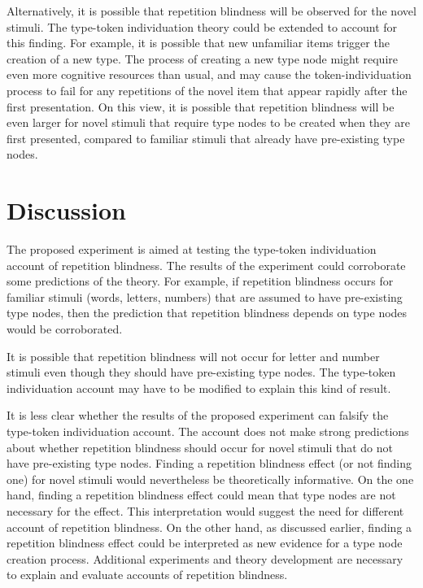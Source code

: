\documentclass[
  man,floatsintext]{apa6}
\begin{document}
Alternatively, it is possible that repetition blindness will be observed for the novel stimuli. The type-token individuation theory could be extended to account for this finding. For example, it is possible that new unfamiliar items trigger the creation of a new type. The process of creating a new type node might require even more cognitive resources than usual, and may cause the token-individuation process to fail for any repetitions of the novel item that appear rapidly after the first presentation. On this view, it is possible that repetition blindness will be even larger for novel stimuli that require type nodes to be created when they are first presented, compared to familiar stimuli that already have pre-existing type nodes.

\hypertarget{discussion}{%
\section{Discussion}\label{discussion}}

The proposed experiment is aimed at testing the type-token individuation account of repetition blindness. The results of the experiment could corroborate some predictions of the theory. For example, if repetition blindness occurs for familiar stimuli (words, letters, numbers) that are assumed to have pre-existing type nodes, then the prediction that repetition blindness depends on type nodes would be corroborated.

It is possible that repetition blindness will not occur for letter and number stimuli even though they should have pre-existing type nodes. The type-token individuation account may have to be modified to explain this kind of result.

It is less clear whether the results of the proposed experiment can falsify the type-token individuation account. The account does not make strong predictions about whether repetition blindness should occur for novel stimuli that do not have pre-existing type nodes. Finding a repetition blindness effect (or not finding one) for novel stimuli would nevertheless be theoretically informative. On the one hand, finding a repetition blindness effect could mean that type nodes are not necessary for the effect. This interpretation would suggest the need for different account of repetition blindness. On the other hand, as discussed earlier, finding a repetition blindness effect could be interpreted as new evidence for a type node creation process. Additional experiments and theory development are necessary to explain and evaluate accounts of repetition blindness.
\end{document}
